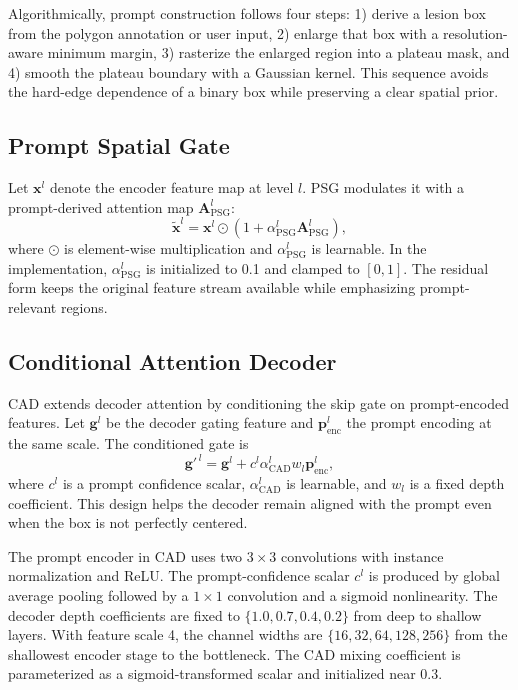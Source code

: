 \documentclass{ieeeaccess}
\begin{document}
Algorithmically, prompt construction follows four steps: 1) derive a lesion box from the polygon annotation or user input, 2) enlarge that box with a resolution-aware minimum margin, 3) rasterize the enlarged region into a plateau mask, and 4) smooth the plateau boundary with a Gaussian kernel. This sequence avoids the hard-edge dependence of a binary box while preserving a clear spatial prior.

\subsection{Prompt Spatial Gate}
Let $\mathbf{x}^{l}$ denote the encoder feature map at level $l$. PSG modulates it with a prompt-derived attention map $\mathbf{A}^{l}_{\mathrm{PSG}}$:
\begin{equation}
\widetilde{\mathbf{x}}^{l}
=
\mathbf{x}^{l}\odot
\left(1+\alpha^{l}_{\mathrm{PSG}}\mathbf{A}^{l}_{\mathrm{PSG}}\right),
\end{equation}
where $\odot$ is element-wise multiplication and $\alpha^{l}_{\mathrm{PSG}}$ is learnable. In the implementation, $\alpha^{l}_{\mathrm{PSG}}$ is initialized to 0.1 and clamped to $[0,1]$. The residual form keeps the original feature stream available while emphasizing prompt-relevant regions.

\subsection{Conditional Attention Decoder}
CAD extends decoder attention by conditioning the skip gate on prompt-encoded features. Let $\mathbf{g}^{l}$ be the decoder gating feature and $\mathbf{p}^{l}_{\mathrm{enc}}$ the prompt encoding at the same scale. The conditioned gate is
\begin{equation}
\mathbf{g}'^{\,l}=\mathbf{g}^{l}+c^{l}\alpha^{l}_{\mathrm{CAD}}w_{l}\mathbf{p}^{l}_{\mathrm{enc}},
\end{equation}
where $c^{l}$ is a prompt confidence scalar, $\alpha^{l}_{\mathrm{CAD}}$ is learnable, and $w_{l}$ is a fixed depth coefficient. This design helps the decoder remain aligned with the prompt even when the box is not perfectly centered.

The prompt encoder in CAD uses two $3\times3$ convolutions with instance normalization and ReLU. The prompt-confidence scalar $c^{l}$ is produced by global average pooling followed by a $1\times1$ convolution and a sigmoid nonlinearity. The decoder depth coefficients are fixed to $\{1.0,0.7,0.4,0.2\}$ from deep to shallow layers. With feature scale 4, the channel widths are $\{16,32,64,128,256\}$ from the shallowest encoder stage to the bottleneck. The CAD mixing coefficient is parameterized as a sigmoid-transformed scalar and initialized near 0.3.
\end{document}
